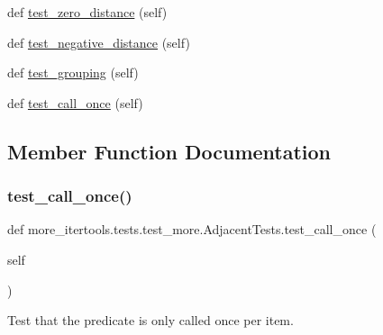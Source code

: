 \begin{DoxyCompactItemize}
def \hyperlink{classmore__itertools_1_1tests_1_1test__more_1_1_adjacent_tests_ae0151c008f26401c1b1d598c3c746de0}{test\+\_\+zero\+\_\+distance} (self)
\item 
def \hyperlink{classmore__itertools_1_1tests_1_1test__more_1_1_adjacent_tests_a2781ce7dd259322dc869eb1327efd1b4}{test\+\_\+negative\+\_\+distance} (self)
\item 
def \hyperlink{classmore__itertools_1_1tests_1_1test__more_1_1_adjacent_tests_ac597c8866662391ce7a0c0bba7cfc20b}{test\+\_\+grouping} (self)
\item 
def \hyperlink{classmore__itertools_1_1tests_1_1test__more_1_1_adjacent_tests_a8937f71fada56791cf42898600027949}{test\+\_\+call\+\_\+once} (self)
\end{DoxyCompactItemize}


\subsection{Member Function Documentation}
\mbox{\label{classmore__itertools_1_1tests_1_1test__more_1_1_adjacent_tests_a8937f71fada56791cf42898600027949}} 
\subsubsection{\texorpdfstring{test\+\_\+call\+\_\+once()}{test\_call\_once()}}
{\footnotesize\ttfamily def more\+\_\+itertools.\+tests.\+test\+\_\+more.\+Adjacent\+Tests.\+test\+\_\+call\+\_\+once (\begin{DoxyParamCaption}\item[{}]{self }\end{DoxyParamCaption})}

\begin{DoxyVerb}Test that the predicate is only called once per item.\end{DoxyVerb}
 \mbox{\label{classmore__itertools_1_1tests_1_1test__more_1_1_adjacent_tests_a7233cc456ea857a668a4ab85766ca68c}} 
